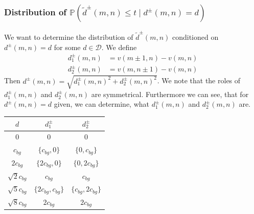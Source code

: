 \documentclass{beamer}
\begin{document}
\begin{frame}
	\subsubsection{Distribution of $\mathbb{P}(\tilde{d}^\pm(m, n) \leq t \mid d^\pm(m, n) = d)$}
	
	We want to determine the distribution of $\tilde{d}^\pm(m, n)$ conditioned on $d^\pm(m, n) = d$ for some $d \in \mathcal{D}$. We define
	\begin{align*}
		d_1^\pm(m, n) &= v(m \pm 1, n) - v(m, n) \\
		d_2^\pm(m, n) &= v(m, n \pm 1) - v(m, n)
	\end{align*}
	Then $d^\pm(m, n) = \sqrt{d_1^\pm(m, n)^2 + d_2^\pm(m, n)^2}$. We note that the roles of $d_1^\pm(m, n)$ and $d_2^\pm(m, n)$ are symmetrical. Furthermore we can see, that for $d^\pm(m, n) = d$ given, we can determine, what $d_1^\pm(m, n)$ and $d_2^\pm(m, n)$ are.
\end{frame}

\begin{frame}
	\begin{center}
		\begin{tabular}{c|c|c}
			$d$ & $d_1^\pm$ & $d_2^\pm$ \\
			\hline
			$0$ & $0$ & $0$ \\
			\hline
			$c_{bg}$ & $\{ c_{bg}, 0 \}$ & $\{ 0, c_{bg} \}$ \\
			\hline
			$2 c_{bg}$ & $\{ 2 c_{bg}, 0 \}$ & $\{ 0, 2 c_{bg} \}$ \\
			\hline
			$\sqrt{2} c_{bg}$ & $c_{bg}$ & $c_{bg}$ \\
			\hline
			$\sqrt{5} c_{bg}$ & $\{ 2 c_{bg}, c_{bg} \}$ & $\{ c_{bg}, 2 c_{bg} \}$ \\
			\hline
			$\sqrt{8} c_{bg}$ & $2 c_{bg}$ & $2 c_{bg}$ \\
		\end{tabular}
	\end{center}
\end{frame}
\end{document}
